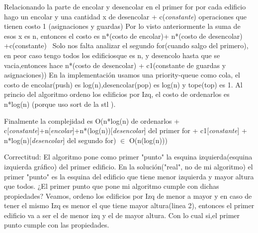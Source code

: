\documentclass{article}
\begin{document}
Relacionando la parte de encolar y desencolar en el primer for
por cada edificio hago un encolar y una cantidad x de desencolar + c(\textit{constante}) operaciones que tienen costo 1 (asignaciones y guardas)
Por lo visto anteriormente la suma de esos x es n, entonces el costo es  n*(costo de encolar)+ n*(costo de desencolar) +c(constante)
\newline\
Solo nos falta analizar el segundo for(cuando salgo del primero), en peor caso tengo todos los edificiosque es  n, y desencolo hasta que se vacia,entonces hace n*(costo de desencolar) + c1(constante de guardas y asignaciones))
En la implementación usamos una priority-queue como cola, el costo de encolar(push) es log(n),desencolar(pop) es log(n) y tope(top) es 1.
\newline
Al princio del algoritmo ordeno los edificios por Izq, el costo de ordenarlos es n*log(n) (porque uso sort de la stl \color{red}{según este link} \color{black}).\newline

Finalmente la complejidad es \newline
O(n*log(n) de ordenarlos \newline
+ c[\textit{constante}]+n[\textit{encolar}]+n*(log(n))[\textit{desencolar}] del primer for \newline
+ c1[\textit{constante}] + n*log(n)[\textit{desencolar}] del segundo for)  $\in$ O(n(log(n))) \newline
\newpage



{\noindent \Huge Correctitud:}
\newline \newline
El algoritmo pone como primer "punto" la esquina izquierda(esquina izquierda gráfico) del primer edificio.\newline
En la solución("real", no de mi algoritmo) el primer "punto" es la esquina del edificio que tiene menor izquierda y mayor altura que todos.\newline
\color{red}{demo} \color{black}\newline
¿El primer punto que pone mi algoritmo cumple con dichas propiedades?
Veamos, ordeno los edificios por Izq de menor a mayor y en caso de tener el mismo Izq es menor el que tiene mayor altura(linea 2),
entonces el primer edificio va a ser el de menor izq y el de mayor altura.\newline
Con lo cual si,el primer punto cumple con las propiedades.
\newline
\end{document}
